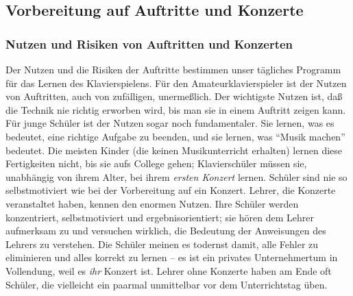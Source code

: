 
\subsection{Vorbereitung auf Auftritte und Konzerte}
\label{c1iii14} 

\subsubsection{Nutzen und Risiken von Auftritten und Konzerten}
\label{c1iii14a}

Der Nutzen und die Risiken der Auftritte bestimmen unser tägliches Programm für das Lernen des Klavierspielens.
Für den Amateurklavierspieler ist der Nutzen von Auftritten, auch von zufälligen, unermeßlich.
Der wichtigste Nutzen ist, daß die Technik nie richtig erworben wird, bis man sie in einem Auftritt zeigen kann.
Für junge Schüler ist der Nutzen sogar noch fundamentaler.
Sie lernen, was es bedeutet, eine richtige Aufgabe zu beenden, und sie lernen, was \enquote{Musik machen} bedeutet.
Die meisten Kinder (die keinen Musikunterricht erhalten) lernen diese Fertigkeiten nicht, bis sie aufs College gehen; Klavierschüler müssen sie, unabhängig von ihrem Alter, bei ihrem \textit{ersten Konzert} lernen.
Schüler sind nie so selbstmotiviert wie bei der Vorbereitung auf ein Konzert.
Lehrer, die Konzerte veranstaltet haben, kennen den enormen Nutzen.
Ihre Schüler werden konzentriert, selbstmotiviert und ergebnisorientiert; sie hören dem Lehrer aufmerksam zu und versuchen wirklich, die Bedeutung der Anweisungen des Lehrers zu verstehen.
Die Schüler meinen es todernst damit, alle Fehler zu eliminieren und alles korrekt zu lernen -- es ist ein privates Unternehmertum in Vollendung, weil es \textit{ihr} Konzert ist.
Lehrer ohne Konzerte haben am Ende oft Schüler, die vielleicht ein paarmal unmittelbar vor dem Unterrichtstag üben.

